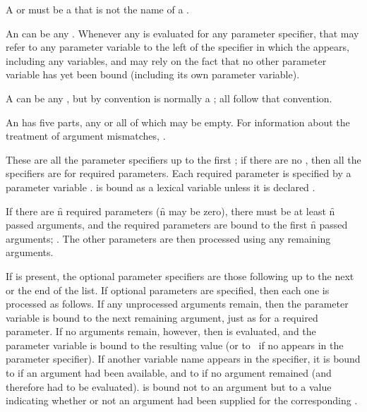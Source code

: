 A  or  must be a 
that is not the name of a .

An  can be any .
Whenever any  is evaluated for any parameter
specifier, that  may refer to any parameter variable to
the left of the specifier in which the  appears,
including any  variables, and may rely 
on the fact that no other parameter variable has yet been bound
(including its own parameter variable).

A  can be any , 
but by convention is normally a ;
all   follow that convention.

An  has five parts, any or all of which may be empty.
For information about the treatment of argument mismatches,
\seesection\FuncallErrorChecking.


     
These are all the parameter specifiers up to 
the first ;
if there are no , 
then all the specifiers are for required parameters.
Each required parameter is specified by a parameter variable .
 is bound as a lexical variable unless it is declared .

If there are \f{n} required parameters (\f{n} may be zero), 
there must be at least \f{n} passed arguments, and the 
required parameters are bound to the first \f{n} passed arguments;
\seesection\FuncallErrorChecking.
The other parameters are then processed using any remaining arguments.

\endsubsubsection%



If  is present,
the optional parameter specifiers are those following 
up to the next  or the end of the list.
If optional parameters are specified, then each one is processed as
follows.  If any unprocessed arguments remain, then the parameter variable
 is bound to the next remaining argument, just as for a required
parameter.  If no arguments remain, however, then  
is evaluated, and the parameter variable
is bound to the resulting value 
(or to \nil\ if no  appears
in the parameter specifier).
If another variable name  
appears in the specifier, it is bound
to  if an argument had been available, and to  if no
argument remained (and therefore  had to be evaluated).
is bound not to an argument but to a value indicating whether or not
an argument had been supplied for the corresponding .

